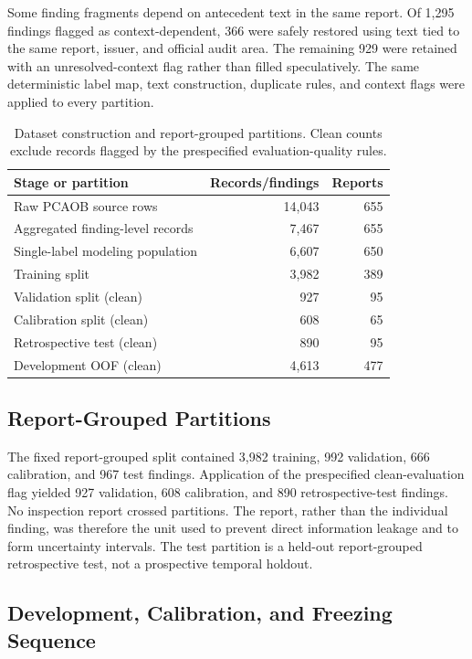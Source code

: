 \documentclass[11pt]{article}
\begin{document}
Some finding fragments depend on antecedent text in the same report. Of 1,295
findings flagged as context-dependent, 366 were safely restored using text tied to
the same report, issuer, and official audit area. The remaining 929 were retained
with an unresolved-context flag rather than filled speculatively. The same
deterministic label map, text construction, duplicate rules, and context flags
were applied to every partition.

\begin{table}[t]
  \centering
  \caption{Dataset construction and report-grouped partitions. Clean counts exclude records flagged by the prespecified evaluation-quality rules.}
  \label{tab:data}
  \begin{tabular}{lrr}
    \toprule
    Stage or partition & Records/findings & Reports \\
    \midrule
    Raw PCAOB source rows & 14,043 & 655 \\
    Aggregated finding-level records & 7,467 & 655 \\
    Single-label modeling population & 6,607 & 650 \\
    Training split & 3,982 & 389 \\
    Validation split (clean) & 927 & 95 \\
    Calibration split (clean) & 608 & 65 \\
    Retrospective test (clean) & 890 & 95 \\
    Development OOF (clean) & 4,613 & 477 \\
    \bottomrule
  \end{tabular}
\end{table}

\subsection{Report-Grouped Partitions}

The fixed report-grouped split contained 3,982 training, 992 validation, 666
calibration, and 967 test findings. Application of the prespecified clean-evaluation
flag yielded 927 validation, 608 calibration, and 890 retrospective-test findings.
No inspection report crossed partitions. The report, rather than the individual
finding, was therefore the unit used to prevent direct information leakage and to
form uncertainty intervals. The test partition is a held-out report-grouped
retrospective test, not a prospective temporal holdout.

\subsection{Development, Calibration, and Freezing Sequence}
\end{document}
